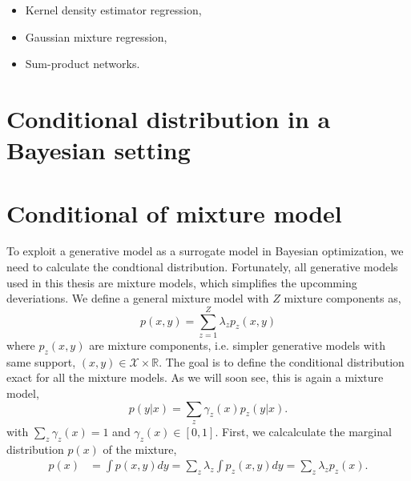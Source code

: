 \begin{itemize}[noitemsep]
     \item Kernel density estimator regression,
     \item Gaussian mixture regression,
     \item Sum-product networks.
 \end{itemize}




 \section{Conditional distribution in a Bayesian setting}\label{mixture_include_prior}
 




\section{Conditional of mixture model}\label{Conditional_mixture}
To exploit a generative model as a surrogate model in Bayesian optimization, we need to calculate
the condtional distribution. Fortunately, all generative models used in this thesis are mixture
models, which simplifies the upcomming deveriations. We define a general mixture model with $Z$ mixture
components as, 
$$p(x,y) = \sum_{z=1}^Z \lambda_z p_z(x,y)$$ where $p_z(x,y)$ are mixture components, i.e. simpler
generative models with same support, $(x,y) \in \mathcal{X}\times \mathbb{R}$. 
The goal is to define
the conditional distribution exact for all the mixture models. As we will soon see, this is again a
mixture model, 
$$p(y|x) = \sum_z \gamma_z(x) p_z(y|x).$$ with $\sum_z \gamma_z(x) = 1$ and $\gamma_z(x) \in [0,1]$.
First, we calcalculate the marginal distribution $p(x)$ of the mixture, 
\begin{align*}
    p(x) &= \int p(x,y) dy =\sum_{z} \lambda_z \int p_z(x,y) dy =\sum_{z} \lambda_z p_z(x).
\end{align*}

